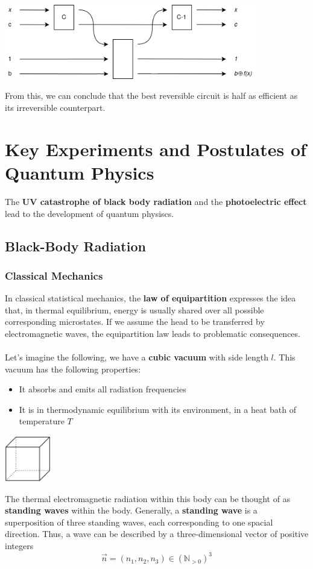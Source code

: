 \documentclass{article}
\begin{document}
\begin{center}
	\includegraphics[width=11cm]{assets/remove_junk.png}
\end{center}
From this, we can conclude that the best reversible circuit is half as efficient as its irreversible counterpart.

\section{Key Experiments and Postulates of Quantum Physics}
The \textbf{UV catastrophe of black body radiation} and the \textbf{photoelectric effect} lead to the development of quantum physiscs.

\subsection{Black-Body Radiation}
\subsubsection{Classical Mechanics}
In classical statistical mechanics, the \textbf{law of equipartition} expresses the idea that, in thermal equilibrium, energy is usually shared over all possible corresponding microstates. If we assume the head to be transferred by electromagnetic waves, the equipartition law leads to problematic consequences. \\ \\
Let's imagine the following, we have a \textbf{cubic vacuum} with side length $l$. This vacuum has the following properties:

\begin{itemize}
	\item It absorbs and emits all radiation frequencies
	\item It is in thermodynamic equilibrium with its environment, in a heat bath of temperature $T$
\end{itemize}

\begin{center}
	\includegraphics[width=2cm]{assets/cube.png}
\end{center}
The thermal electromagnetic radiation within this body can be thought of as \textbf{standing waves} within the body. Generally, a \textbf{standing wave} is a superposition of three standing waves, each corresponding to one spacial direction. Thus, a wave can be described by a three-dimensional vector of positive integers
\[ \overrightarrow n = (n_1, n_2, n_3) \in (\mathbb{N}_{> 0})^3 \]
\end{document}

